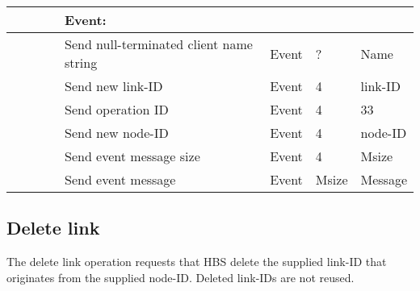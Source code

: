 \begin{tabular}{|p{1.2in}|p{.4in}|p{.4in}|p{.5in}|p{1.2in}|p{.4in}|p{.4in}|p{.5in} |}
\multicolumn{4}{|l}{~}&\multicolumn{4}{|l|}{{\bf Event:}} \\ \hline
                  &        &       &       & Send null-terminated client
                                             name string  & Event  &  ?    & Name  \\ \hline
                  &        &       &       & Send new link-ID  & Event  &   4   &   link-ID    \\  \hline
                  &        &       &       & Send operation 
                                             ID           & Event  &   4   &  33   \\ \hline
                  &        &       &       & Send new node-ID     & Event  &   4   &  node-ID    \\ \hline
                  &        &       &       & Send event message
                                                  size    & Event  &   4   &  Msize \\ \hline
                  &        &       &       & Send event message
                                                          & Event  & Msize & Message  \\ \hline
\end{tabular}
\normalsize
\bigskip



\newpage
\subsection{Delete link}

The delete link operation requests that HBS delete the
supplied link-ID that originates from the supplied node-ID.  
Deleted link-IDs are not reused. 



